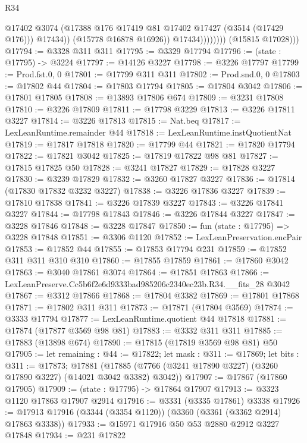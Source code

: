\begin{lexlean}{R34}
\begin{coremodule}
                              @17402
                              @3074
                              (@17388 @176 @17419 @81 @17402 @17427 (@3514 (@17429 @176)))
                              @17434))
                          (@15778 @16878 @16926))
                        @17434))))))))
        (@15815 @17028)))
@17794 := @3328 @311 @311
@17795 := @3329 @17794
@17796 := (state : @17795) -> @3224
@17797 := @14126 @3227
@17798 := @3226 @17797
@17799 := Prod.fst.{0, 0}
@17801 := @17799 @311 @311
@17802 := Prod.snd.{0, 0}
@17803 := @17802 @44
@17804 := @17803 @17794
@17805 := @17804 @3042
@17806 := @17801 @17805
@17808 := @13893 @17806 @674
@17809 := @3231 @17808
@17810 := @3226 @17809
@17811 := @17798 @3229
@17813 := @3226 @17811 @3227
@17814 := @3226 @17813
@17815 := Nat.beq
@17817 := LexLeanRuntime.remainder @44
@17818 := LexLeanRuntime.instQuotientNat
@17819 := @17817 @17818
@17820 := @17799 @44
@17821 := @17820 @17794
@17822 := @17821 @3042
@17825 := @17819 @17822 @98 @81
@17827 := @17815 @17825 @50
@17828 := @3241 @17827
@17829 := @17828 @3227
@17830 := @3239 @17829
@17832 := @3260 @17827 @3227
@17836 := @17814 (@17830 @17832 @3232 @3227)
@17838 := @3226 @17836 @3227
@17839 := @17810 @17838
@17841 := @3226 @17839 @3227
@17843 := @3226 @17841 @3227
@17844 := @17798 @17843
@17846 := @3226 @17844 @3227
@17847 := @3228 @17846
@17848 := @3228 @17847
@17850 := fun (state : @17795) => @3228 @17848
@17851 := @3306 @1120
@17852 := LexLeanPreservation.encPair
@17853 := @17852 @44
@17855 := @17853 @17794 @231
@17859 := @17852 @311 @311 @310 @310
@17860 := @17855 @17859
@17861 := @17860 @3042
@17863 := @3040 @17861 @3074
@17864 := @17851 @17863
@17866 := LexLeanPreserve.Cc5b6f2e6d9333bad985206c2340ec23b.R34.__fits_28 @3042
@17867 := @3312 @17866
@17868 := @17804 @3382
@17869 := @17801 @17868
@17871 := @17802 @311 @311
@17873 := @17871 (@17804 @3569)
@17874 := @3333 @17794
@17877 := LexLeanRuntime.quotient @44 @17818
@17881 := @17874 (@17877 @3569 @98 @81)
@17883 := @3332 @311 @311
@17885 := @17883 (@13898 @674)
@17890 := @17815 (@17819 @3569 @98 @81) @50
@17905 := let remaining : @44 := @17822;
  let mask : @311 := @17869;
  let bits : @311 := @17873;
  @17881 (@17885 (@7766 (@3241 @17890 @3227) (@3260 @17890 @3227) (@14021 @3042 @3382) @3042))
@17907 := @17867 (@17860 @17905)
@17909 := (state : @17795) -> @17864 @17907
@17913 := @3323 @1120 @17863 @17907 @2914
@17916 := @3331 (@3335 @17861) @3338
@17926 := @17913 @17916 (@3344 (@3354 @1120)) (@3360 (@3361 (@3362 @2914) @17863 @3338))
@17933 := @15971 @17916 @50 @53 @2880 @2912 @3227 @17848
@17934 := @231 @17822

\end{coremodule}
\end{lexlean}
